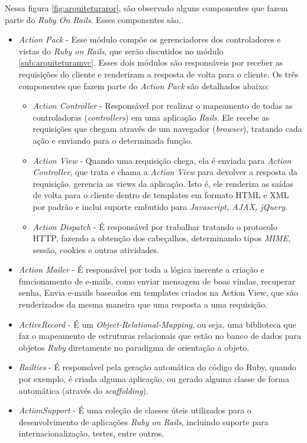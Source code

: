 Nessa figura \ref{fig:arquiteturaror}, são observado alguns componentes que fazem parte do \textit{Ruby On Rails}. Esses componentes são.

\begin{itemize}
	\item \textit{Action Pack} - Esse módulo compõe os gerenciadores dos controladores e vistas do \textit{Ruby on Rails}, que serão discutidos no módulo \ref{sub:arquiteturamvc}. Esses dois módulos são responsáveis por receber as requisições do cliente e renderizam a resposta de volta para o cliente. Os três componentes que fazem parte do \textit{Action Pack} são detalhados abaixo:
	\begin{itemize}
		\item \textit{Action Controller} - Responsável por realizar o mapeamento de todas as controladoras (\textit{controllers}) em uma aplicação \textit{Rails}. Ele recebe as requisições que chegam através de um navegador (\textit{browser}), tratando cada ação e enviando para o determinada função.
		\item \textit{Action View} - Quando uma requisição chega, ela é enviada para \textit{Action Controller}, que trata e chama a \textit{Action View} para devolver a resposta da requisição. gerencia as views da aplicação. Isto é, ele renderiza as saídas de volta para o cliente dentro de templates em formato HTML e XML por padrão e inclui suporte embutido para \textit{Javascript, AJAX, jQuery}.
		\item \textit{Action Dispatch} - É responsável por trabalhar tratando o protocolo HTTP, fazendo a obtenção dos cabeçalhos, determinando tipos \textit{MIME}, sessão, cookies e outras atividades.
	\end{itemize}
	\item \textit{Action Mailer} - É responsável por toda a lógica inerente a criação e funcionamento de e-mails, como enviar mensagem de boas vindas, recuperar senha, Envia e-mails baseados em templates criados na Action View, que são renderizados da mesma maneira que uma resposta a uma requisição.
	\item \textit{ActiveRecord} - É um \textit{Object-Relational-Mapping}, ou seja, uma biblioteca que faz o mapeamento de estruturas relacionais que estão no banco de dados para objetos \textit{Ruby} diretamente no paradigma de orientação a objeto.
	\item \textit{Railties } - É responsável pela geração automática do código do Ruby, quando por exemplo, é criada alguma aplicação, ou gerado alguma classe de forma automática (através do \textit{scaffolding}).  
	\item \textit{ActionSupport} -  É uma coleção de classes úteis  utilizados para o desenvolvimento de aplicações \textit{Ruby on Rails}, incluindo suporte para internacionalização, testes, entre outros.
\end{itemize}


